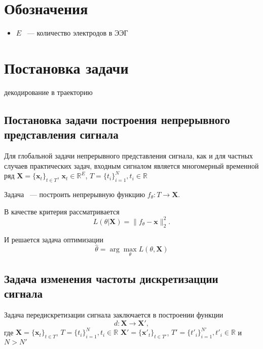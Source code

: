 \documentclass[12pt]{article}
\newcommand{\x}{\mathbf{x}}
\newcommand{\X}{\mathbf{X}}
\newcommand{\R}{\mathbb{R}}
\begin{document}
\newpage
\section*{Обозначения}

\begin{itemize}
    \item $E$ ~--- количество электродов в ЭЭГ

\end{itemize}


\newpage
\section{Постановка задачи}



    декодирование в траекторию


\subsection{Постановка задачи построения непрерывного представления сигнала}
Для глобальной задачи непрерывного представления сигнала, как и для частных случаев практических задач, входным сигналом является многомерный временной ряд $\X = \{\x_t\}_{t\in T}$, $\x_t \in \R^E$, $T = \{t_i\}_{i=1}^{N}, t_i \in \R$

Задача ~--- построить непрерывную функцию $f_{\theta}: T \to \X $.

В качестве критерия рассматривается
\begin{equation}
L(\theta|\X) = \|f_{\theta} - \x\|^2_2.
\end{equation}

И решается задача оптимизации
\begin{equation}
\hat{\theta} = \arg\max_{\theta} L(\theta, \X)
\end{equation}

\subsection{Задача изменения частоты дискретизацции сигнала}
Задача передискретизации сигнала заключается в построении функции 
\begin{equation}
    d: \X \to \X',
\end{equation}
где $\X = \{\x_t\}_{t\in T}$, $T = \{t_i\}_{i=1}^{N}, t_i \in \R$
$\X' = \{\x'_t\}_{t\in T'}$, $T' = \{t'_i\}_{i=1}^{N'}, t'_i \in \R$
и $N > N'$
\end{document}
